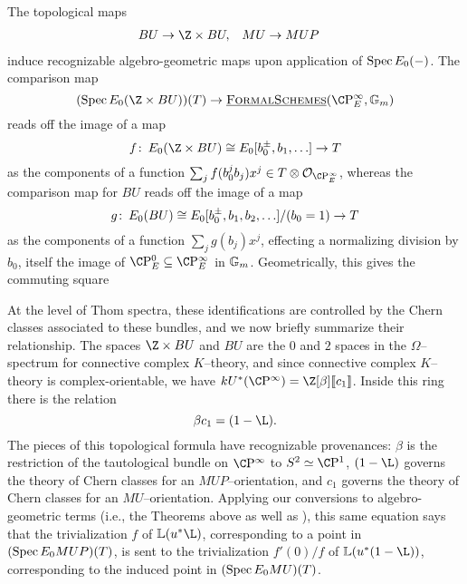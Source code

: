 \begin{remark}\label{BUtoBUZ}
The topological maps
\begin{align*}
BU & \to \Z \times BU, &
MU & \to MUP
\end{align*}
induce recognizable algebro-geometric maps upon application of \(\operatorname{Spec} E_0(-)\).  The comparison map \[(\Spec E_0(\Z \times BU))(T) \to \InternalHom{FormalSchemes}(\CP^\infty_E, \Gm)\] reads off the image of a map \[f\co E_0(\Z \times BU) \cong E_0[b_0^\pm, b_1, \ldots] \to T\] as the components of a function \(\sum_j f(b_0^j b_j) x^j \in T \otimes \sheaf O_{\CP^\infty_E}\), whereas the comparison map for \(BU\) reads off the image of a map \[g\colon\thinspace E_0(BU) \cong E_0[b_0^\pm, b_1, b_2, \ldots] / (b_0 = 1) \to T\] as the components of a function \(\sum_j g(b_j)x^j\), effecting a normalizing division by \(b_0\), itself the image of \(\CP^0_E \subseteq \CP^\infty_E\) in \(\mathbb G_m\).  Geometrically, this gives the commuting square
\begin{center}
\end{center}

At the level of Thom spectra, these identifications are controlled by the Chern classes associated to these bundles, and we now briefly summarize their relationship.  The spaces \(\Z \times BU\) and \(BU\) are the \(0\){\th} and \(2\){\nd} spaces in the \(\Omega\)--spectrum for connective complex \(K\)--theory, and since connective complex \(K\)--theory is complex-orientable, we have \(kU^*(\CP^\infty) = \Z[\beta]\ps{c_1}\).  Inside this ring there is the relation \[\beta c_1 = (1 - \L).\]  The pieces of this topological formula have recognizable provenances: \(\beta\) is the restriction of the tautological bundle on \(\CP^\infty\) to \(S^2 \simeq \CP^1\), \((1 - \L)\) governs the theory of Chern classes for an \(MUP\)--orientation, and \(c_1\) governs the theory of Chern classes for an \(MU\)--orientation.  Applying our conversions to algebro-geometric terms (i.e., the Theorems above as well as ), this same equation says that the trivialization \(f\) of \(\ThomSheaf{u^* \L}\), corresponding to a point in \((\operatorname{Spec} E_0 MUP)(T)\), is sent to the trivialization \(f'(0) / f\) of \(\ThomSheaf{u^*(1 - \L)}\), corresponding to the induced point in \((\operatorname{Spec} E_0 MU)(T)\).
\end{remark}


